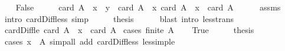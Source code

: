\begin{isabellebody}
\isamarkupfalse%
\isanewline
\ \ \isamarkupfalse%
\ False\isanewline
\ \ \isamarkupfalse%
\ \isamarkupfalse%
\ {\isachardoublequoteopen}card\ {\isacharparenleft}{\kern0pt}A\ {\isacharminus}{\kern0pt}\ {\isacharbraceleft}{\kern0pt}x{\isacharbraceright}{\kern0pt}\ {\isacharminus}{\kern0pt}\ {\isacharbraceleft}{\kern0pt}y{\isacharbraceright}{\kern0pt}{\isacharparenright}{\kern0pt}\ {\isacharless}{\kern0pt}\ card\ {\isacharparenleft}{\kern0pt}A\ {\isacharminus}{\kern0pt}\ {\isacharbraceleft}{\kern0pt}x{\isacharbraceright}{\kern0pt}{\isacharparenright}{\kern0pt}{\isachardoublequoteclose}\ {\isachardoublequoteopen}card\ {\isacharparenleft}{\kern0pt}A\ {\isacharminus}{\kern0pt}\ {\isacharbraceleft}{\kern0pt}x{\isacharbraceright}{\kern0pt}{\isacharparenright}{\kern0pt}\ {\isacharless}{\kern0pt}\ card\ A{\isachardoublequoteclose}\isanewline
\ \ \ \ \isamarkupfalse%
\ assms\ \isamarkupfalse%
\ {\isacharparenleft}{\kern0pt}intro\ card{\isacharunderscore}{\kern0pt}Diff{}{\isacharunderscore}{\kern0pt}less{\isacharsemicolon}{\kern0pt}\ simp{\isacharparenright}{\kern0pt}{\isacharplus}{\kern0pt}\isanewline
\ \ \isamarkupfalse%
\ \isamarkupfalse%
\ {\isacharquery}{\kern0pt}thesis\isanewline
\ \ \ \ \isamarkupfalse%
\ {\isacharparenleft}{\kern0pt}blast\ intro{\isacharcolon}{\kern0pt}\ less{\isacharunderscore}{\kern0pt}trans{\isacharparenright}{\kern0pt}\isanewline
{}\isamarkupfalse%
%
\endisatagproof
{\isafoldproof}%
%
\isadelimproof
\isanewline
%
\endisadelimproof
\isanewline
{}\isamarkupfalse%
\ card{\isacharunderscore}{\kern0pt}Diff{}{\isacharunderscore}{\kern0pt}le{\isacharcolon}{\kern0pt}\ {\isachardoublequoteopen}card\ {\isacharparenleft}{\kern0pt}A\ {\isacharminus}{\kern0pt}\ {\isacharbraceleft}{\kern0pt}x{\isacharbraceright}{\kern0pt}{\isacharparenright}{\kern0pt}\ {\isasymle}\ card\ A{\isachardoublequoteclose}\isanewline
%
\isadelimproof
%
\endisadelimproof
%
\isatagproof
{}\isamarkupfalse%
\ {\isacharparenleft}{\kern0pt}cases\ {\isachardoublequoteopen}finite\ A{\isachardoublequoteclose}{\isacharparenright}{\kern0pt}\isanewline
\ \ \isamarkupfalse%
\ True\isanewline
\ \ \isamarkupfalse%
\ \isamarkupfalse%
\ {\isacharquery}{\kern0pt}thesis\ \ \isanewline
\ \ \ \ \isamarkupfalse%
\ {\isacharparenleft}{\kern0pt}cases\ {\isachardoublequoteopen}x\ {\isasymin}\ A{\isachardoublequoteclose}{\isacharparenright}{\kern0pt}\ {\isacharparenleft}{\kern0pt}simp{\isacharunderscore}{\kern0pt}all\ add{\isacharcolon}{\kern0pt}\ card{\isacharunderscore}{\kern0pt}Diff{}{\isacharunderscore}{\kern0pt}less\ less{\isacharunderscore}{\kern0pt}imp{\isacharunderscore}{\kern0pt}le{\isacharparenright}{\kern0pt}\isanewline

\end{isabellebody}
